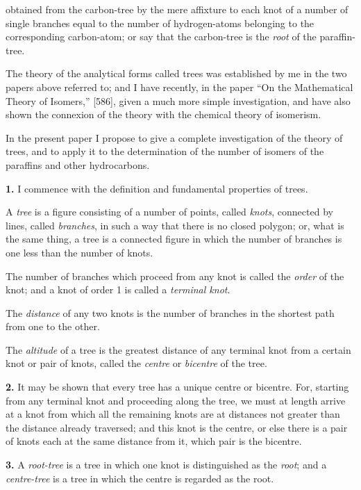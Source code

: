 \documentclass[11pt,a4paper]{book}
\begin{document}
{obtained from the carbon-tree by the mere affixture to each knot of a number of single branches equal to the number of hydrogen-atoms belonging to the corresponding carbon-atom; or say that the carbon-tree is the \textit{root} of the paraffin-tree.

The theory of the analytical forms called trees was established by me in the two papers above referred to; and I have recently, in the paper ``On the Mathematical Theory of Isomers,'' [586], given a much more simple investigation, and have also shown the connexion of the theory with the chemical theory of isomerism.

In the present paper I propose to give a complete investigation of the theory of trees, and to apply it to the determination of the number of isomers of the paraffins and other hydrocarbons.

\medskip
\noindent\textbf{1.}
I commence with the definition and fundamental properties of trees.

A \textit{tree} is a figure consisting of a number of points, called \textit{knots}, connected by lines, called \textit{branches}, in such a way that there is no closed polygon; or, what is the same thing, a tree is a connected figure in which the number of branches is one less than the number of knots.

The number of branches which proceed from any knot is called the \textit{order} of the knot; and a knot of order 1 is called a \textit{terminal knot}.

The \textit{distance} of any two knots is the number of branches in the shortest path from one to the other.

The \textit{altitude} of a tree is the greatest distance of any terminal knot from a certain knot or pair of knots, called the \textit{centre} or \textit{bicentre} of the tree.

\medskip
\noindent\textbf{2.}
It may be shown that every tree has a unique centre or bicentre. For, starting from any terminal knot and proceeding along the tree, we must at length arrive at a knot from which all the remaining knots are at distances not greater than the distance already traversed; and this knot is the centre, or else there is a pair of knots each at the same distance from it, which pair is the bicentre.

\medskip
\noindent\textbf{3.}
A \textit{root-tree} is a tree in which one knot is distinguished as the \textit{root}; and a \textit{centre-tree} is a tree in which the centre is regarded as the root.

}
\end{document}
